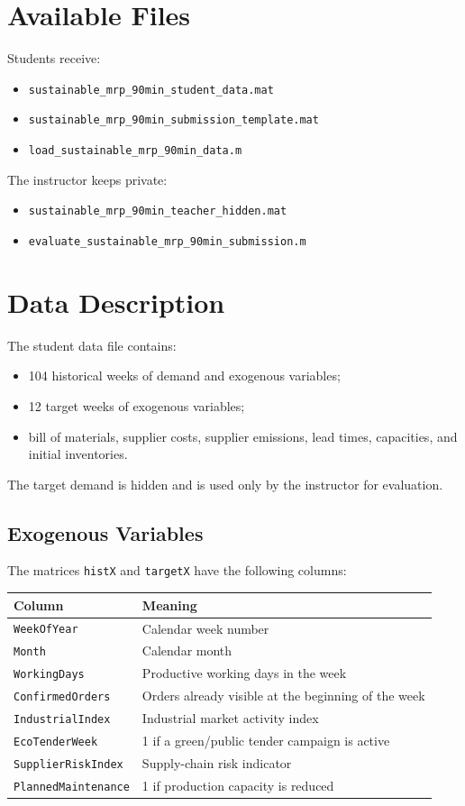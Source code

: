 \documentclass[11pt,a4paper]{article}
\begin{document}
\section*{Available Files}
Students receive:
\begin{itemize}
    \item \texttt{sustainable\_mrp\_90min\_student\_data.mat}
    \item \texttt{sustainable\_mrp\_90min\_submission\_template.mat}
    \item \texttt{load\_sustainable\_mrp\_90min\_data.m}
\end{itemize}

The instructor keeps private:
\begin{itemize}
    \item \texttt{sustainable\_mrp\_90min\_teacher\_hidden.mat}
    \item \texttt{evaluate\_sustainable\_mrp\_90min\_submission.m}
\end{itemize}

\section*{Data Description}
The student data file contains:
\begin{itemize}
    \item 104 historical weeks of demand and exogenous variables;
    \item 12 target weeks of exogenous variables;
    \item bill of materials, supplier costs, supplier emissions, lead times, capacities, and initial inventories.
\end{itemize}

The target demand is hidden and is used only by the instructor for evaluation.

\subsection*{Exogenous Variables}
The matrices \texttt{histX} and \texttt{targetX} have the following columns:
\begin{center}
\begin{tabular}{ll}
\toprule
Column & Meaning \\
\midrule
\texttt{WeekOfYear} & Calendar week number \\
\texttt{Month} & Calendar month \\
\texttt{WorkingDays} & Productive working days in the week \\
\texttt{ConfirmedOrders} & Orders already visible at the beginning of the week \\
\texttt{IndustrialIndex} & Industrial market activity index \\
\texttt{EcoTenderWeek} & 1 if a green/public tender campaign is active \\
\texttt{SupplierRiskIndex} & Supply-chain risk indicator \\
\texttt{PlannedMaintenance} & 1 if production capacity is reduced \\
\bottomrule
\end{tabular}
\end{center}
\end{document}
